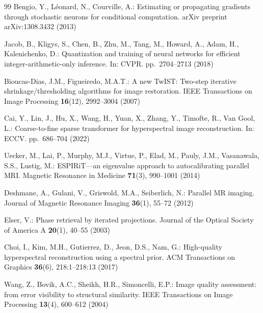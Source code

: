 \documentclass[runningheads]{llncs}
\begin{document}
\begin{thebibliography}{99}
Bengio, Y., L{\'e}onard, N., Courville, A.:
Estimating or propagating gradients through stochastic neurons for conditional computation.
arXiv preprint arXiv:1308.3432 (2013)

Jacob, B., Kligys, S., Chen, B., Zhu, M., Tang, M., Howard, A., Adam, H., Kalenichenko, D.:
Quantization and training of neural networks for efficient integer-arithmetic-only inference.
In: CVPR. pp.~2704--2713 (2018)

Bioucas-Dias, J.M., Figueiredo, M.A.T.:
A new TwIST: Two-step iterative shrinkage/thresholding algorithms for image restoration.
IEEE Transactions on Image Processing \textbf{16}(12), 2992--3004 (2007)

Cai, Y., Lin, J., Hu, X., Wang, H., Yuan, X., Zhang, Y., Timofte, R., Van Gool, L.:
Coarse-to-fine sparse transformer for hyperspectral image reconstruction.
In: ECCV. pp.~686--704 (2022)

Uecker, M., Lai, P., Murphy, M.J., Virtue, P., Elad, M., Pauly, J.M., Vasanawala, S.S., Lustig, M.:
ESPIRiT---an eigenvalue approach to autocalibrating parallel MRI.
Magnetic Resonance in Medicine \textbf{71}(3), 990--1001 (2014)

Deshmane, A., Gulani, V., Griswold, M.A., Seiberlich, N.:
Parallel MR imaging.
Journal of Magnetic Resonance Imaging \textbf{36}(1), 55--72 (2012)

Elser, V.:
Phase retrieval by iterated projections.
Journal of the Optical Society of America A \textbf{20}(1), 40--55 (2003)

Choi, I., Kim, M.H., Gutierrez, D., Jeon, D.S., Nam, G.:
High-quality hyperspectral reconstruction using a spectral prior.
ACM Transactions on Graphics \textbf{36}(6), 218:1--218:13 (2017)

Wang, Z., Bovik, A.C., Sheikh, H.R., Simoncelli, E.P.:
Image quality assessment: from error visibility to structural similarity.
IEEE Transactions on Image Processing \textbf{13}(4), 600--612 (2004)

\end{thebibliography}
\end{document}
